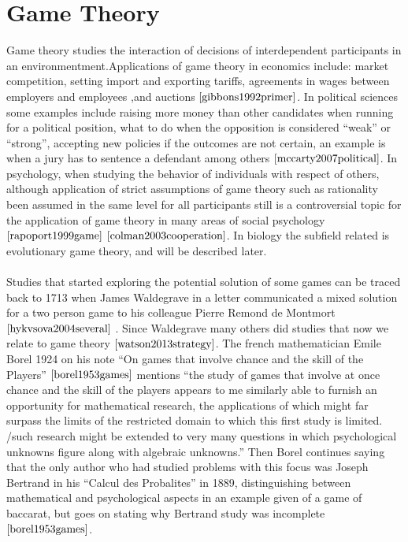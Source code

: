 \section{Game Theory}
\label{Literature:gt}
Game theory studies the interaction of decisions of interdependent participants in an environmentment.Applications of game theory in economics include: market competition, setting import and exporting tariffs, agreements in wages between employers and employees ,and auctions $\cite{gibbons1992primer}$. In political sciences some examples include raising more money than other candidates when running for a political position, what to do when the opposition is considered “weak” or “strong”, accepting new policies if the outcomes are not certain,  an example is when a jury has to sentence a defendant among others $\cite{mccarty2007political}$. In psychology, when studying the behavior of individuals with respect of others, although application of strict assumptions of game theory such as rationality been assumed in the same level for all participants still is a controversial topic for the application of game theory in many areas of social psychology $\cite{rapoport1999game}$ $\cite{colman2003cooperation}$. In biology the subfield related is evolutionary game theory, and will be described later. 
\\\\Studies that started exploring the potential solution of some games can be traced back to 1713  when James Waldegrave in a letter communicated a mixed solution for a two person game to his colleague Pierre Remond de Montmort $\cite{hykvsova2004several}$ . Since Waldegrave many others did studies that now we relate to game theory $\cite{watson2013strategy}$. The french mathematician Emile Borel 1924  on his note ``On games that involve chance and the skill of the Players'' $\cite{borel1953games}$ mentions  ``the study of games that involve at once chance and the skill of the players appears to me similarly able to furnish an opportunity for mathematical research, the applications of which might far surpass the limits of the restricted domain to which this first study is limited. /such research might be extended to very many questions in which psychological unknowns figure along with algebraic unknowns.'' Then Borel continues saying that the only author who had studied problems with this focus was Joseph Bertrand in his ``Calcul des Probalites'' in 1889, distinguishing between mathematical and psychological aspects in an example given of a game of baccarat, but goes on stating why Bertrand study was incomplete $\cite{borel1953games}$.
